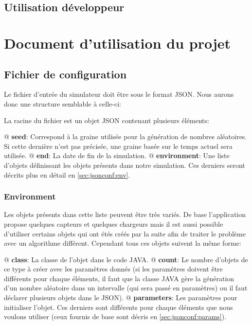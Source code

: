 \documentclass[noposter,final]{polytech/polytech}
\begin{document}
	\section{Utilisation développeur}

\chapter{Document d'utilisation du projet}
	\section{Fichier de configuration\label{sec:jsoninput}}
		Le fichier d'entrée du simulateur doit être sous le format JSON.
		Nous aurons donc une structure semblable à celle-ci:
		
		La racine du fichier est un objet JSON contenant plusieurs éléments:
		\begin{easylist}[itemize]
			@ \textbf{seed}: Correspond à la graine utilisée pour la génération de nombres aléatoires. Si cette dernière n'est pas précisée, une graine basée sur le temps actuel sera utilisée.
			@ \textbf{end}: La date de fin de la simulation. 
			@ \textbf{environment}: Une liste d'objets définissant les objets présents dans notre simulation. Ces derniers seront décrits plus en détail en \autoref{sec:jsonconf:env}.	
		\end{easylist}
		
		\subsection{Environment\label{sec:jsonconf:env}}
			Les objets présents dans cette liste peuvent être très variés.
			De base l'application propose quelques capteurs et quelques chargeurs mais il est aussi possible d'utiliser certains objets qui ont étés créés par la suite afin de traiter le problème avec un algorithme différent.
			Cependant tous ces objets suivent la même forme:
			\begin{easylist}[itemize]
				@ \textbf{class}: La classe de l'objet dans le code JAVA.
				@ \textbf{count}: Le nombre d'objets de ce type à créer avec les paramètres donnés (si les paramètres doivent être différents pour chaque éléments, il faut que la classe JAVA gère la génération d'un nombre aléatoire dans un intervalle (qui sera passé en paramètres) ou il faut déclarer plusieurs objets dans le JSON).	
				@ \textbf{parameters}: Les paramètres pour initialiser l'objet. Ces derniers sont différents pour chaque éléments que nous voulons utiliser (ceux fournis de base sont décris en \autoref{sec:jsonconf:params}).
			\end{easylist}
\end{document}
